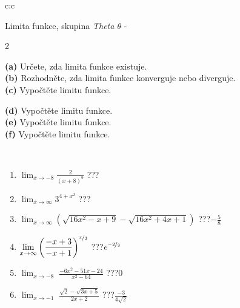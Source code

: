 \documentclass[10pt]{report}
\begin{document}
\begin{tabular}{c:c}
\begin{minipage}[c][104.5mm][t]{0.5\linewidth}
\begin{center}
\vspace{7mm}
{\huge Limita funkce, skupina \textit{Theta $\theta$} -}\\[5mm]
\begin{minipage}{0.95\linewidth}
\begin{center}
{\small \begin{multicols}{2} \raggedright
\textbf{(a)} Určete, zda limita funkce existuje. \\[1mm]
\textbf{(b)} Rozhodněte, zda limita funkce konverguje nebo diverguje. \\[1mm]
\textbf{(c)} Vypočtěte limitu funkce. \par \columnbreak
\textbf{(d)} Vypočtěte limitu funkce. \\[1mm]
\textbf{(e)} Vypočtěte limitu funkce. \\[1mm]
\textbf{(f)} Vypočtěte limitu funkce. \\[1mm]
\end{multicols}
}
\end{center}
\end{minipage}
\\[4mm]
\begin{minipage}{0.79\linewidth}
\begin{center}
\begin{varwidth}{\linewidth}
\begin{enumerate}
\normalsize
\item $\displaystyle\lim_{x\to-8}{\frac{2}{(x+8)^{9}}}$\quad \dotfill\; ???\;\dotfill \quad {}
\item $\displaystyle\lim_{x\to\infty}{3^{4+x^2}}$\quad \dotfill\; ???\;\dotfill \quad {}
\item $\displaystyle\lim_{x\to\infty}{\left(\sqrt{16x^2-x+9} - \sqrt{16x^2+4x+1}\right)}$\quad \dotfill\; ???\;\dotfill \quad $-\frac{5}{8}$
\item $\displaystyle\lim_{x\to\infty}{\left( \frac{-x+3}{-x+1} \right)^{\nicefrac{x}{3}}}$\quad \dotfill\; ???\;\dotfill \quad $e^{\nicefrac{-2}{3}}$
\item $\displaystyle\lim_{x\to -8}{\;\frac{-6x^2-51x-24}{x^2-64}}$\quad \dotfill\; ???\;\dotfill \quad $0$
\item $\displaystyle\lim_{x\to -1}{\;\frac{\sqrt{2}-\sqrt{3x+5}}{2x+2}}$\quad \dotfill\; ???\;\dotfill \quad $\frac{-3}{4\sqrt{2}}$

\end{enumerate}
\end{varwidth}
\end{center}
\end{minipage}
\end{center}
\end{minipage}
\end{tabular}
\end{document}
